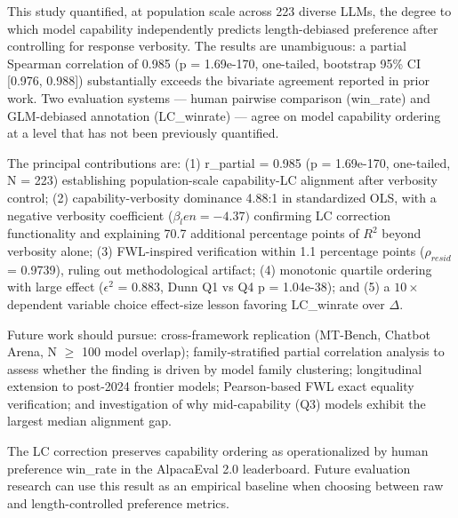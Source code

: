 
This study quantified, at population scale across 223 diverse LLMs, the degree to which model capability independently predicts length-debiased preference after controlling for response verbosity. The results are unambiguous: a partial Spearman correlation of 0.985 (p = 1.69e-170, one-tailed, bootstrap 95\% CI [0.976, 0.988]) substantially exceeds the bivariate agreement reported in prior work. Two evaluation systems --- human pairwise comparison (win\_rate) and GLM-debiased annotation (LC\_winrate) --- agree on model capability ordering at a level that has not been previously quantified.

The principal contributions are: (1) r\_partial = 0.985 (p = 1.69e-170, one-tailed, N = 223) establishing population-scale capability-LC alignment after verbosity control; (2) capability-verbosity dominance 4.88:1 in standardized OLS, with a negative verbosity coefficient ($\beta _len = -4.37)$ confirming LC correction functionality and explaining 70.7 additional percentage points of $R^2$ beyond verbosity alone; (3) FWL-inspired verification within 1.1 percentage points ($\rho_{resid}$ = 0.9739), ruling out methodological artifact; (4) monotonic quartile ordering with large effect ($\epsilon ^2$ = 0.883, Dunn Q1 vs Q4 p = 1.04e-38); and (5) a $10\times$ dependent variable choice effect-size lesson favoring LC\_winrate over $\Delta$.

Future work should pursue: cross-framework replication (MT-Bench, Chatbot Arena, N $\geq$ 100 model overlap); family-stratified partial correlation analysis to assess whether the finding is driven by model family clustering; longitudinal extension to post-2024 frontier models; Pearson-based FWL exact equality verification; and investigation of why mid-capability (Q3) models exhibit the largest median alignment gap.

The LC correction preserves capability ordering as operationalized by human preference win\_rate in the AlpacaEval 2.0 leaderboard. Future evaluation research can use this result as an empirical baseline when choosing between raw and length-controlled preference metrics.

